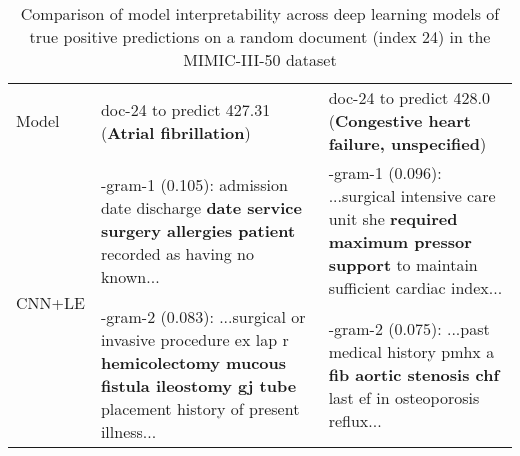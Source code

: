 \documentclass[final,5p,times,twocolumn]{elsarticle}
\begin{document}
\begin{table*}[th]
\caption{Comparison of model interpretability across deep learning models of true positive predictions on a random document (index 24) in the MIMIC-III-50 dataset}\label{tp-interpretability-results}
\footnotesize
\begin{threeparttable}
\begin{tabular}{lp{7.5cm}||p{7.5cm}}
\cline{1-3}
Model                    & doc-24 to predict 427.31 (\textbf{Atrial fibrillation})                                                                                                                                                                                                                                                                                                                                                & doc-24 to predict 428.0 (\textbf{Congestive heart failure, unspecified})                                                                                                                                                                                                                                                             \\
\cline{1-3}
\multirow{3}{*}{CNN+LE}  & -gram-1 (0.105): admission date discharge \textbf{date service surgery allergies patient} recorded as having no known...                                                                                                                                                                                                                                                                                                                          & -gram-1 (0.096): ...surgical intensive care unit she \textbf{required maximum pressor support} to maintain sufficient cardiac index...\\
\cline{2-3}
                         & -gram-2 (0.083): ...surgical or invasive procedure ex lap r \textbf{hemicolectomy mucous fistula ileostomy gj tube} placement history of present illness...                                                                                                                                                                                                                                                                                                                                                          & -gram-2 (0.075): ...past medical history pmhx a \textbf{fib aortic stenosis chf} last ef in osteoporosis reflux...\\
                         \cline{2-3}

\end{tabular}
\end{threeparttable}
\end{table*}
\end{document}
